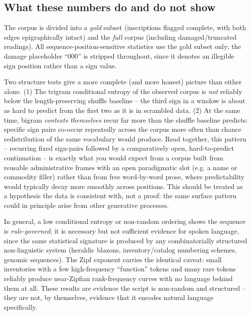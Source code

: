\subsection*{What these numbers do and do not show}
The corpus is divided into a \emph{gold} subset (inscriptions flagged complete,
with both edges epigraphically intact) and the \emph{full} corpus (including
damaged/truncated readings). All sequence-position-sensitive statistics use
the gold subset only; the damage placeholder ``000'' is stripped throughout,
since it denotes an illegible sign position rather than a sign value.

Two structure tests give a more complete (and more honest) picture than
either alone. (1) The trigram conditional entropy of the observed corpus is
\emph{not} reliably below the length-preserving shuffle baseline -- the third
sign in a window is about as hard to predict from the first two as it is in
scrambled data. (2) At the same time, bigram \emph{contexts themselves} recur
far more than the shuffle baseline predicts: specific sign pairs co-occur
repeatedly across the corpus more often than chance redistribution of the
same vocabulary would produce. Read together, this pattern -- recurring
fixed sign-pairs followed by a comparatively open, hard-to-predict
continuation -- is exactly what you would expect from a corpus built from
reusable administrative frames with an open paradigmatic slot (e.g. a
name or commodity filler) rather than from free word-by-word prose, where
predictability would typically decay more smoothly across positions. This
should be treated as a hypothesis the data is consistent with, not a proof:
the same surface pattern could in principle arise from other generative
processes.

In general, a low conditional entropy or non-random ordering shows the
sequence is \emph{rule-governed}; it is necessary but not sufficient evidence
for spoken language, since the same statistical signature is produced by any
combinatorially structured non-linguistic system (heraldic blazons,
inventory/catalog numbering schemes, genomic sequences). The Zipf exponent
carries the identical caveat: small inventories with a few high-frequency
``function'' tokens and many rare tokens reliably produce near-Zipfian
rank-frequency curves with no language behind them at all. These results are
evidence the script is non-random and structured -- they are not, by
themselves, evidence that it encodes natural language specifically.
